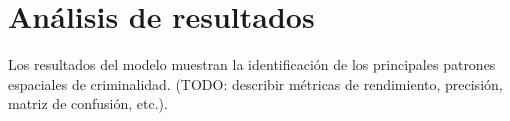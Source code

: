 
\section{Análisis de resultados}

\label{sec:analisis_resultados}

\begin{figure}[htbp]
\centering %
\end{figure}

Los resultados del modelo muestran la identificación de los principales
patrones espaciales de criminalidad. (TODO: describir métricas de
rendimiento, precisión, matriz de confusión, etc.).
